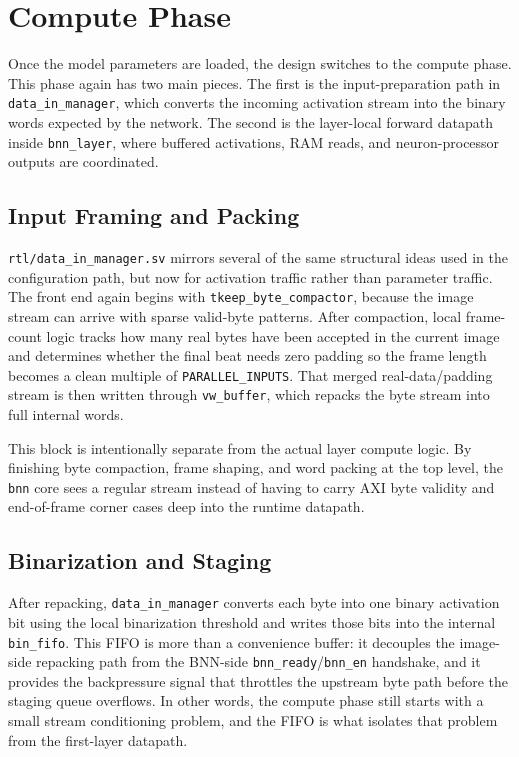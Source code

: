 \section{Compute Phase}

Once the model parameters are loaded, the design switches to the compute phase.
This phase again has two main pieces. The first is the input-preparation path
in \texttt{data\_in\_manager}, which converts the incoming activation stream
into the binary words expected by the network. The second is the layer-local
forward datapath inside \texttt{bnn\_layer}, where buffered activations, RAM
reads, and neuron-processor outputs are coordinated.

\subsection{Input Framing and Packing}

\texttt{rtl/data\_in\_manager.sv} mirrors several of the same structural ideas
used in the configuration path, but now for activation traffic rather than
parameter traffic. The front end again begins with
\texttt{tkeep\_byte\_compactor}, because the image stream can arrive with sparse
valid-byte patterns. After compaction, local frame-count logic tracks how many
real bytes have been accepted in the current image and determines whether the
final beat needs zero padding so the frame length becomes a clean multiple of
\texttt{PARALLEL\_INPUTS}. That merged real-data/padding stream is then written
through \texttt{vw\_buffer}, which repacks the byte stream into full internal
words.

This block is intentionally separate from the actual layer compute logic. By
finishing byte compaction, frame shaping, and word packing at the top level,
the \texttt{bnn} core sees a regular stream instead of having to carry AXI byte
validity and end-of-frame corner cases deep into the runtime datapath.

\subsection{Binarization and Staging}

After repacking, \texttt{data\_in\_manager} converts each byte into one binary
activation bit using the local binarization threshold and writes those bits
into the internal \texttt{bin\_fifo}. This FIFO is more than a convenience
buffer: it decouples the image-side repacking path from the BNN-side
\texttt{bnn\_ready}/\texttt{bnn\_en} handshake, and it provides the backpressure
signal that throttles the upstream byte path before the staging queue
overflows. In other words, the compute phase still starts with a small stream
conditioning problem, and the FIFO is what isolates that problem from the
first-layer datapath.


